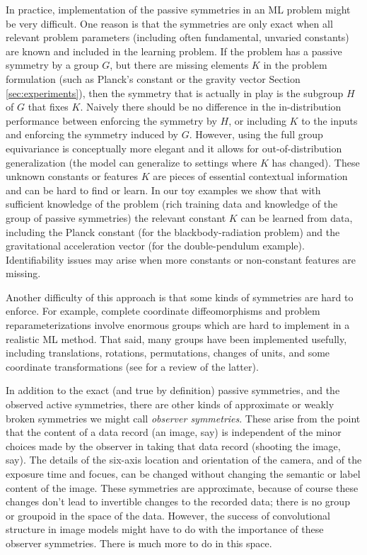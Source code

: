 \documentclass{article}
\theoremstyle{plain}
\theoremstyle{definition}
\theoremstyle{remark}
\begin{document}
In practice, implementation of the passive symmetries in an ML problem might be very difficult.
One reason is that the symmetries are only exact when all relevant problem parameters (including often fundamental, unvaried constants) are known and included in the learning problem.
If the problem has a passive symmetry by a group $G$, but there are missing elements $K$ in the problem formulation (such as Planck's constant or the gravity vector Section \ref{sec:experiments}), then the symmetry that is actually in play is the subgroup $H$ of $G$ that fixes $K$. 
Naively there should be no difference in the in-distribution performance between enforcing the symmetry by $H$, or including $K$ to the inputs and enforcing the symmetry induced by $G$. 
However, using the full group equivariance is conceptually more elegant and it allows for out-of-distribution generalization (the model can generalize to settings where  $K$ has changed).
These unknown constants or features $K$ are pieces of essential contextual information and can be hard to find or learn. 
In our toy examples we show that with sufficient knowledge of the problem (rich training data and knowledge of the group of passive symmetries) the relevant constant $K$ can be learned from data, including the Planck constant (for the blackbody-radiation problem) and the gravitational acceleration vector (for the double-pendulum example).
Identifiability issues may arise when more constants or non-constant features are missing.
   

Another difficulty of this approach is that some kinds of symmetries are hard to enforce.
For example, complete coordinate diffeomorphisms and problem reparameterizations involve enormous groups which are hard to implement in a realistic ML method.
That said, many groups have been implemented usefully, including translations, rotations, permutations, changes of units, and some coordinate transformations (see \citealt{weiler} for a review of the latter). 

In addition to the exact (and true by definition) passive symmetries, and the observed active symmetries, there are other kinds of approximate or weakly broken symmetries we might call \emph{observer symmetries}.
These arise from the point that the content of a data record (an image, say) is independent of the minor choices made by the observer in taking that data record (shooting the image, say).
The details of the six-axis location and orientation of the camera, and of the exposure time and focues, can be changed without changing the semantic or label content of the image.
These symmetries are approximate, because of course these changes don't lead to invertible changes to the recorded data; there is no group or groupoid in the space of the data.
However, the success of convolutional structure in image models might have to do with the importance of these observer symmetries.
There is much more to do in this space.
\end{document}
